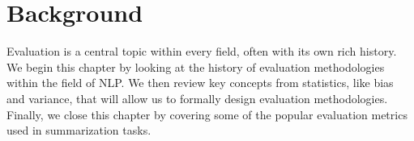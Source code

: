 \chapter{\label{chap:setup} Background}
Evaluation is a central topic within every field, often with its own rich history.
We begin this chapter by looking at the history of evaluation methodologies within the field of NLP.\@
We then review key concepts from statistics, like bias and variance, that will allow us to formally design evaluation methodologies.
Finally, we close this chapter by covering some of the popular evaluation metrics used in summarization tasks. 




